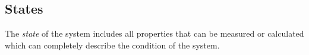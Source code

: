 \subsection{States}\label{subsec:States}
\begin{definition}[State]\label{def:State}
  The \emph{state} of the system includes all properties that can be measured or calculated which can completely describe the condition of the system.
\end{definition}



